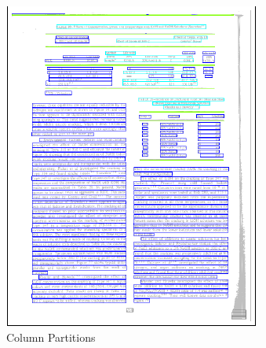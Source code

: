 \begin{figure}[H]
\begin{subfigure}{0.31\textwidth}
\includegraphics[width=\linewidth]{img/tableDetection/tableDetectionPartitions.pdf}
\caption{Column Partitions} \label{fig:1b}
\end{subfigure}
\hspace*{\fill} %
\begin{subfigure}{0.31\textwidth}

\end{subfigure}
\end{figure}
